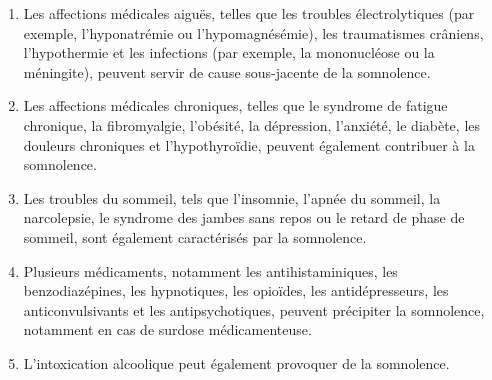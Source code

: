 \begin{enumerate}
    \item Les affections médicales aiguës, telles que les troubles électrolytiques (par exemple, l'hyponatrémie ou l'hypomagnésémie), les traumatismes crâniens, l'hypothermie et les infections (par exemple, la mononucléose ou la méningite), peuvent servir de cause sous-jacente de la somnolence.
    \item  Les affections médicales chroniques, telles que le syndrome de fatigue chronique, la fibromyalgie, l'obésité, la dépression, l'anxiété, le diabète, les douleurs chroniques et l'hypothyroïdie, peuvent également contribuer à la somnolence.
    \item Les troubles du sommeil, tels que l'insomnie, l'apnée du sommeil, la narcolepsie, le syndrome des jambes sans repos ou le retard de phase de sommeil, sont également caractérisés par la somnolence.
    \item Plusieurs médicaments, notamment les antihistaminiques, les benzodiazépines, les hypnotiques, les opioïdes, les antidépresseurs, les anticonvulsivants et les antipsychotiques, peuvent précipiter la somnolence, notamment en cas de surdose médicamenteuse.
    \item L'intoxication alcoolique peut également provoquer de la somnolence.
\end{enumerate}



